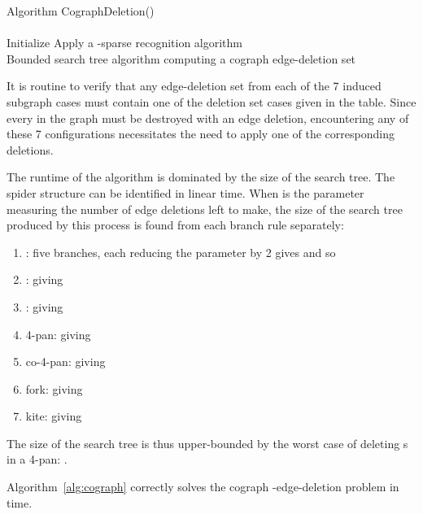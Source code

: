 \documentclass{llncs}
\begin{document}
\begin{algorithm}[H]
\SetAlgoLined Algorithm {\sc CographDeletion()}\\
\ \\
Initialize \;
Apply a -sparse recognition algorithm\;
\ \\
\caption{Bounded search tree algorithm computing a cograph edge-deletion set}
\label{alg:cograph}
\end{algorithm}

It is routine to verify that any edge-deletion set from each of the 7 induced subgraph cases must contain one of the deletion set cases given in the table. Since every  in the graph must be destroyed with an edge deletion, encountering any of these 7 configurations necessitates the need to apply one of the corresponding deletions.

The runtime of the algorithm is dominated by the size of the search tree. The spider structure can be identified in linear time. When  is the parameter measuring the number of edge deletions left to make, the size  of the search tree produced by this process is found from each branch rule separately:
\begin{enumerate}
  \item : five branches, each reducing the parameter by 2 gives  and so 
  \item :  giving 
  \item :  giving 
  \item 4-pan:  giving 
  \item co-4-pan:  giving 
  \item fork:  giving 
  \item kite:  giving 
\end{enumerate}

The size of the search tree is thus upper-bounded by the worst case of deleting s in a 4-pan: .

\begin{theorem}
Algorithm~\ref{alg:cograph} correctly solves the cograph -edge-deletion problem in {} time.
\end{theorem}
\end{document}
